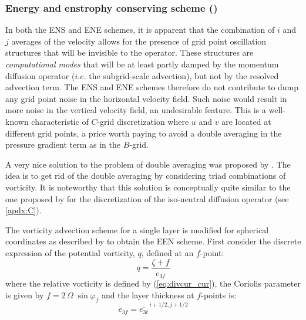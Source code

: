 \documentclass[../tex_main/NEMO_manual]{subfiles}
\begin{document}
\subsubsection{Energy and enstrophy conserving scheme (\protect{}) }
\label{subsec:DYN_vor_een}

In both the ENS and ENE schemes, it is apparent that the combination of $i$ and $j$ 
averages of the velocity allows for the presence of grid point oscillation structures 
that will be invisible to the operator. These structures are \textit{computational modes} 
that will be at least partly damped by the momentum diffusion operator ($i.e.$ the 
subgrid-scale advection), but not by the resolved advection term. The ENS and ENE schemes
therefore do not contribute to dump any grid point noise in the horizontal velocity field.
Such noise would result in more noise in the vertical velocity field, an undesirable feature. 
This is a well-known characteristic of $C$-grid discretization where $u$ and $v$ are located 
at different grid points, a price worth paying to avoid a double averaging in the pressure 
gradient term as in the $B$-grid. 

A very nice solution to the problem of double averaging was proposed by \citet{Arakawa_Hsu_MWR90}. 
The idea is to get rid of the double averaging by considering triad combinations of vorticity. 
It is noteworthy that this solution is conceptually quite similar to the one proposed by
\citep{Griffies_al_JPO98} for the discretization of the iso-neutral diffusion operator (see \autoref{apdx:C}).

The \citet{Arakawa_Hsu_MWR90} vorticity advection scheme for a single layer is modified 
for spherical coordinates as described by \citet{Arakawa_Lamb_MWR81} to obtain the EEN scheme. 
First consider the discrete expression of the potential vorticity, $q$, defined at an $f$-point: 
\begin{equation} \label{eq:pot_vor}
q  = \frac{\zeta +f} {e_{3f} }
\end{equation}
where the relative vorticity is defined by (\autoref{eq:divcur_cur}), the Coriolis parameter 
is given by $f=2 \,\Omega \;\sin \varphi _f $ and the layer thickness at $f$-points is: 
\begin{equation} \label{eq:een_e3f}
e_{3f} = \overline{\overline {e_{3t} }} ^{\,i+1/2,j+1/2}
\end{equation}
\end{document}
